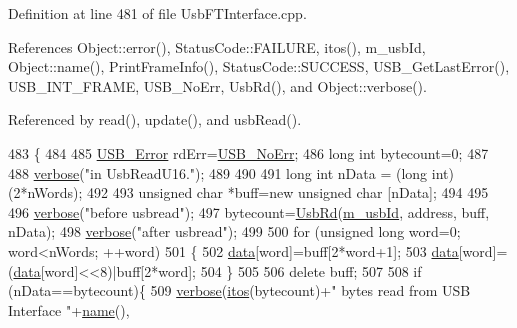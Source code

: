 Definition at line 481 of file Usb\+F\+T\+Interface.\+cpp.



References Object\+::error(), Status\+Code\+::\+F\+A\+I\+L\+U\+RE, itos(), m\+\_\+usb\+Id, Object\+::name(), Print\+Frame\+Info(), Status\+Code\+::\+S\+U\+C\+C\+E\+SS, U\+S\+B\+\_\+\+Get\+Last\+Error(), U\+S\+B\+\_\+\+I\+N\+T\+\_\+\+F\+R\+A\+ME, U\+S\+B\+\_\+\+No\+Err, Usb\+Rd(), and Object\+::verbose().



Referenced by read(), update(), and usb\+Read().


\begin{DoxyCode}
483                                                                \{
484   
485   \hyperlink{LALUsbML_8h_aa7e5a2302774d5aa1d48a2a1cfc46e86}{USB\_Error} rdErr=\hyperlink{LALUsbML_8h_ab44759ae95dd86cbc2855adf525c43cd}{USB\_NoErr};
486   \textcolor{keywordtype}{long} \textcolor{keywordtype}{int} bytecount=0;
487 
488     \hyperlink{classObject_a83d2db2df682907ea1115ad721c1c4a1}{verbose}(\textcolor{stringliteral}{"in UsbReadU16."});
489 
490 
491   \textcolor{keywordtype}{long} \textcolor{keywordtype}{int} nData = (\textcolor{keywordtype}{long} int)(2*nWords);
492   
493   \textcolor{keywordtype}{unsigned} \textcolor{keywordtype}{char} *buff=\textcolor{keyword}{new} \textcolor{keywordtype}{unsigned} \textcolor{keywordtype}{char} [nData];
494 
495 
496     \hyperlink{classObject_a83d2db2df682907ea1115ad721c1c4a1}{verbose}(\textcolor{stringliteral}{"before usbread"});   
497   bytecount=\hyperlink{LALUsbML_8h_a613b00e83691d644c8d1cf05c499392b}{UsbRd}(\hyperlink{classUsbFTInterface_a91df5c0547e8be460bc087e27afe05aa}{m\_usbId}, address, buff, nData);
498     \hyperlink{classObject_a83d2db2df682907ea1115ad721c1c4a1}{verbose}(\textcolor{stringliteral}{"after usbread"});
499 
500   \textcolor{keywordflow}{for} (\textcolor{keywordtype}{unsigned} \textcolor{keywordtype}{long} word=0; word<nWords; ++word)
501   \{
502     \hyperlink{namespaceshell_a5ea2525995cedc3efd69ea8a7f034d1e}{data}[word]=buff[2*word+1];
503     \hyperlink{namespaceshell_a5ea2525995cedc3efd69ea8a7f034d1e}{data}[word]=(\hyperlink{namespaceshell_a5ea2525995cedc3efd69ea8a7f034d1e}{data}[word]<<8)|buff[2*word];
504   \}
505 
506   \textcolor{keyword}{delete} buff;
507 
508   \textcolor{keywordflow}{if} (nData==bytecount)\{
509     \hyperlink{classObject_a83d2db2df682907ea1115ad721c1c4a1}{verbose}(\hyperlink{Tools_8h_af330027dbdafb9a30768b3613c553e60}{itos}(bytecount)+\textcolor{stringliteral}{" bytes read from USB Interface "}+\hyperlink{classObject_a300f4c05dd468c7bb8b3c968868443c1}{name}(),

\end{DoxyCode}
